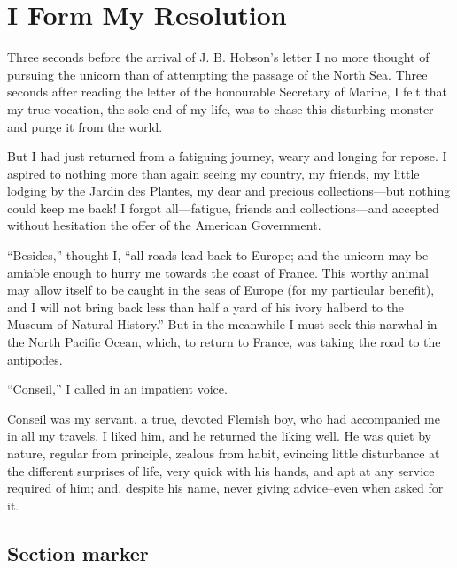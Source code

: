 \chapter{I Form My Resolution}

Three seconds before the arrival of J. B. Hobson's letter I no more thought
of pursuing the unicorn than of attempting the passage of the North Sea.
Three seconds after reading the letter of the honourable Secretary of Marine,
I felt that my true vocation, the sole end of my life, was to chase this
disturbing monster and purge it from the world.

But I had just returned from a fatiguing journey, weary and longing
for repose.  I aspired to nothing more than again seeing my country,
my friends, my little lodging by the Jardin des Plantes,
my dear and precious collections---but nothing could keep me back!
I forgot all---fatigue, friends and collections---and accepted without
hesitation the offer of the American Government.

``Besides,'' thought I, ``all roads lead back to Europe; and the unicorn
may be amiable enough to hurry me towards the coast of France.
This worthy animal may allow itself to be caught in the seas of Europe
(for my particular benefit), and I will not bring back less than half
a yard of his ivory halberd to the Museum of Natural History.''
But in the meanwhile I must seek this narwhal in the North
Pacific Ocean, which, to return to France, was taking the road
to the antipodes.\cite{proceedings-full}

``Conseil,'' I called in an impatient voice.


Conseil was my servant, a true, devoted Flemish boy, who had accompanied
me in all my travels.  I liked him, and he returned the liking well.
He was quiet by nature, regular from principle, zealous from habit,
evincing little disturbance at the different surprises of life,
very quick with his hands, and apt at any service required of him;
and, despite his name, never giving advice--even when asked for it.

\section{Section marker}

